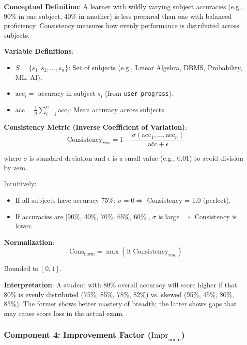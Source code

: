 \documentclass[sigconf,authordraft,twoside]{acmart}
\newcommand{\tech}[1]{\textcolor{brandblue}{\nolinkurl{#1}}}
\begin{document}
\textbf{Conceptual Definition}:
A learner with wildly varying subject accuracies (e.g., 90\% in one subject, 40\% in another) is less prepared than one with balanced proficiency. Consistency measures how evenly performance is distributed across subjects.

\textbf{Variable Definitions}:
\begin{itemize}
\item $S = \{s_1, s_2, \ldots, s_n\}$: Set of subjects (e.g., Linear Algebra, DBMS, Probability, ML, AI).
\item $\text{acc}_i = $ accuracy in subject $s_i$ (from \tech{user\_progress}).
\item $\bar{\text{acc}} = \frac{1}{n} \sum_{i=1}^{n} \text{acc}_i$: Mean accuracy across subjects.
\end{itemize}

\textbf{Consistency Metric (Inverse Coefficient of Variation)}:
\begin{equation}
\text{Consistency}_{raw} = 1 - \frac{\sigma(\text{acc}_1, \ldots, \text{acc}_n)}{\bar{\text{acc}} + \epsilon}
\end{equation}

where $\sigma$ is standard deviation and $\epsilon$ is a small value (e.g., 0.01) to avoid division by zero.

Intuitively:
\begin{itemize}
\item If all subjects have accuracy 75\%: $\sigma = 0 \Rightarrow$ Consistency = 1.0 (perfect).
\item If accuracies are [90\%, 40\%, 70\%, 65\%, 60\%], $\sigma$ is large $\Rightarrow$ Consistency is lower.
\end{itemize}

\textbf{Normalization}:
\begin{equation}
\text{Cons}_{\text{norm}} = \max(0, \text{Consistency}_{raw})
\end{equation}

Bounded to $[0, 1]$.

\textbf{Interpretation}:
A student with 80\% overall accuracy will score higher if that 80\% is evenly distributed (75\%, 85\%, 78\%, 82\%) vs. skewed (95\%, 45\%, 80\%, 85\%). The former shows better mastery of breadth; the latter shows gaps that may cause score loss in the actual exam.

\subsubsection{Component 4: Improvement Factor ($\text{Impr}_{\text{norm}}$)}
\end{document}
